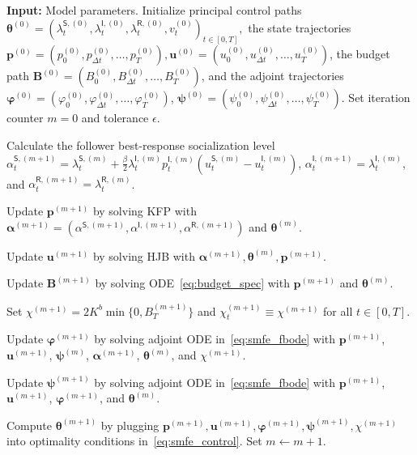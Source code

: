 \documentclass[letterpaper, 10 pt, conference]{ieeeconf}  %
\def\sS{\mathsf{S}}
\def\sI{\mathsf{I}}
\def\sR{\mathsf{R}}
\def\blambda{\boldsymbol{\lambda}}
\newcommand\bp{\boldsymbol{p}}
\newcommand\bu{\boldsymbol{u}}
\newcommand\btheta{\boldsymbol{\theta}}
\newcommand\bpsi{\boldsymbol{\psi}}
\newcommand\bvarphi{\boldsymbol{\varphi}}
\begin{document}
{
\small
\begin{algorithm}
\caption{\small Fixed-point iteration for SMFE \label{alg:stackelberg_single_iter}}
\footnotesize
\textbf{Input:} Model parameters. Initialize principal control paths $\btheta^{(0)}=(
\lambda_t^{\sS,(0)},
\lambda_t^{\sI,(0)},
\lambda_t^{\sR,(0)},
v_t^{(0)})_{t\in[0,T]},$
the state trajectories
$\bp^{(0)}=(p_0^{(0)},p_{\Delta t}^{(0)},\dots,p_T^{(0)}),
\bu^{(0)}=(u_0^{(0)},u_{\Delta t}^{(0)},\dots,u_T^{(0)})$,
the budget path $\boldsymbol B^{(0)}=(B_0^{(0)},B_{\Delta t}^{(0)},\dots,B_T^{(0)})$,
and the adjoint trajectories
$\bvarphi^{(0)}=(\varphi_0^{(0)},\varphi_{\Delta t}^{(0)},\dots,\varphi_T^{(0)})$, $
\bpsi^{(0)}=(\psi_0^{(0)},\psi_{\Delta t}^{(0)},\dots,\psi_T^{(0)})$.
Set iteration counter $m=0$ and tolerance $\epsilon$.
\vskip1mm
\begin{algorithmic}[1]

\WHILE{
$\|x^{(m+1)}-x^{(m)}\|>\epsilon$ for any $x \in \{\blambda, \bp, \bu, \bvarphi, \bpsi, \boldsymbol{B}\}$}\vskip1mm
    \STATE Calculate the follower best-response socialization level
    $\alpha_t^{\sS,(m+1)}=
    \lambda_t^{\sS,(m)}
    +\frac{\beta}{2}\lambda_t^{\sI,(m)}p_t^{\sI,(m)}
    (u_t^{\sS,(m)}-u_t^{\sI,(m)})$,
    $\alpha_t^{\sI,(m+1)}=\lambda_t^{\sI,(m)}$, and 
    $\alpha_t^{\sR,(m+1)}=\lambda_t^{\sR,(m)}$.\vskip1mm

    \STATE Update $\bp^{(m+1)}$ by solving KFP with $\boldsymbol\alpha^{(m+1)}=(\alpha^{\sS,(m+1)},\alpha^{\sI,(m+1)},\alpha^{\sR,(m+1)})$ and $\btheta^{(m)}$.\vskip1mm

    \STATE Update $\bu^{(m+1)}$ by solving HJB with $\boldsymbol\alpha^{(m+1)},\btheta^{(m)},\bp^{(m+1)}.$\vskip1mm

    \STATE Update $\boldsymbol{B}^{(m+1)}$ by solving ODE~\eqref{eq:budget_spec} with $\bp^{(m+1)}$ and $\btheta^{(m)}$.\vskip1mm

    \STATE Set $\chi^{(m+1)} = 2K^b \min\{0,B_T^{(m+1)}\}$
    and $\chi_t^{(m+1)}\equiv \chi^{(m+1)}$ for all $t\in[0,T]$.\vskip1mm

    \STATE Update $\bvarphi^{(m+1)}$ by solving adjoint ODE in~\eqref{eq:smfe_fbode}
    with $\bp^{(m+1)}$, $\bu^{(m+1)}$, $\bpsi^{(m)}$, $\boldsymbol{\alpha}^{(m+1)}$, $\btheta^{(m)}$, and $\chi^{(m+1)}$.\vskip1mm

    \STATE Update $\bpsi^{(m+1)}$ by solving adjoint ODE in~\eqref{eq:smfe_fbode}
    with $\bp^{(m+1)}$, $\bu^{(m+1)}$, $\bvarphi^{(m+1)}$, and $\btheta^{(m)}$.\vskip1mm

    \STATE Compute $\btheta^{(m+1)}$ by plugging
    $\bp^{(m+1)},
    \bu^{(m+1)},
    \bvarphi^{(m+1)},
    \bpsi^{(m+1)},
    \chi^{(m+1)}$
    into optimality conditions in~\eqref{eq:smfe_control}.\vskip1mm
    \STATE Set $m\leftarrow m+1$.\vskip1mm


\end{algorithmic}
\end{algorithm}}
\end{document}

